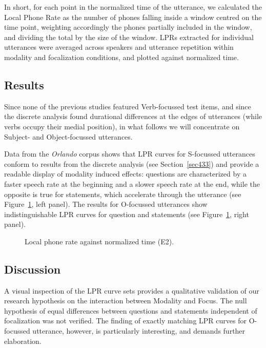 In short, for each point in the normalized time of the utterance, we calculated the Local Phone Rate as the number of phones falling inside a window centred on the time point, weighting accordingly the phones partially included in the window, and dividing the total by the size of the window. LPRs extracted for individual utterances were averaged across speakers and utterance repetition within modality and focalization conditions, and plotted against normalized time.

\subsection{Results}\label{sec443}
Since none of the previous studies featured Verb-focussed test items, and since the discrete analysis found durational differences at the edges of utterances (while verbs occupy their medial position), in what follows we will concentrate on Subject- and Object-focussed utterances.

Data from the \textit{Orlando} corpus shows that LPR curves for S-focussed utterances conform to results from the discrete analysis (see Section~\ref{sec433}) and provide a readable display of modality induced effects: questions are characterized by a faster speech rate at the beginning and a slower speech rate at the end, while the opposite is true for statements, which accelerate through the utterance (see Figure~\ref{fig404}, left panel). The results for O-focussed utterances show indistinguishable LPR curves for question and statements (see Figure~\ref{fig404}, right panel). 

\begin{figure}
\centering
{}
\caption{Local phone rate against normalized time (E2).}
\label{fig404}\end{figure}

\subsection{Discussion}\label{sec444}
A visual inspection of the LPR curve sets provides a qualitative validation of our research hypothesis on the interaction between Modality and Focus. The null hypothesis of equal differences between questions and statements independent of focalization was not verified. The finding of exactly matching LPR curves for O-focussed utterance, however, is particularly interesting, and demands further elaboration.

